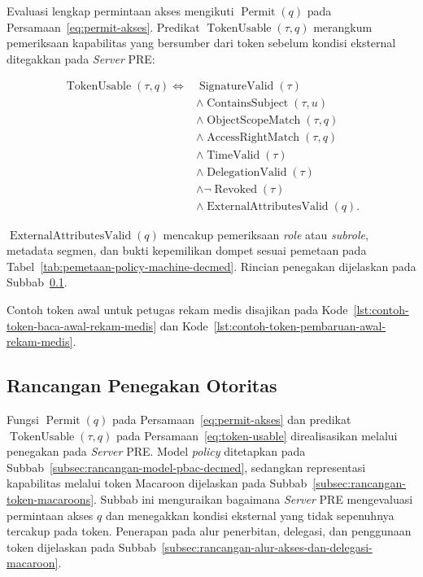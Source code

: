 \documentclass[bahasa, 12pt, a4paper, onecolumn, oneside, final]{report}
\begin{document}
Evaluasi lengkap permintaan akses mengikuti $\operatorname{Permit}(q)$ pada Persamaan~\ref{eq:permit-akses}. Predikat $\operatorname{TokenUsable}(\tau,q)$ merangkum pemeriksaan kapabilitas yang bersumber dari token sebelum kondisi eksternal ditegakkan pada \textit{Server} PRE:

\begin{equation}
	\begin{split}
		\operatorname{TokenUsable}(\tau,q)
		\iff {} &
		\operatorname{SignatureValid}(\tau)                        \\
		        & \land \operatorname{ContainsSubject}(\tau,u)     \\
		        & \land \operatorname{ObjectScopeMatch}(\tau,q)    \\
		        & \land \operatorname{AccessRightMatch}(\tau,q)    \\
		        & \land \operatorname{TimeValid}(\tau)             \\
		        & \land \operatorname{DelegationValid}(\tau)       \\
		        & \land \neg\operatorname{Revoked}(\tau)           \\
		        & \land \operatorname{ExternalAttributesValid}(q).
	\end{split}
	\label{eq:token-usable}
\end{equation}

$\operatorname{ExternalAttributesValid}(q)$ mencakup pemeriksaan \textit{role} atau \textit{subrole}, metadata segmen, dan bukti kepemilikan dompet sesuai pemetaan pada Tabel~\ref{tab:pemetaan-policy-machine-decmed}. Rincian penegakan dijelaskan pada Subbab~\ref{subsec:rancangan-penegakan-otoritas}.

Contoh token awal untuk petugas rekam medis disajikan pada Kode~\ref{lst:contoh-token-baca-awal-rekam-medis} dan Kode~\ref{lst:contoh-token-pembaruan-awal-rekam-medis}.
\subsection{Rancangan Penegakan Otoritas}
\label{subsec:rancangan-penegakan-otoritas}

Fungsi $\operatorname{Permit}(q)$ pada Persamaan~\ref{eq:permit-akses} dan predikat $\operatorname{TokenUsable}(\tau,q)$ pada Persamaan~\ref{eq:token-usable} direalisasikan melalui penegakan pada \textit{Server} PRE. Model \textit{policy} ditetapkan pada Subbab~\ref{subsec:rancangan-model-pbac-decmed}, sedangkan representasi kapabilitas melalui token Macaroon dijelaskan pada Subbab~\ref{subsec:rancangan-token-macaroons}. Subbab ini menguraikan bagaimana \textit{Server} PRE mengevaluasi permintaan akses $q$ dan menegakkan kondisi eksternal yang tidak sepenuhnya tercakup pada token. Penerapan pada alur penerbitan, delegasi, dan penggunaan token dijelaskan pada Subbab~\ref{subsec:rancangan-alur-akses-dan-delegasi-macaroon}.
\end{document}
